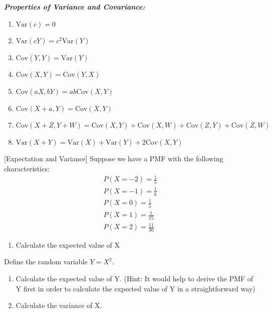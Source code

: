 \documentclass[]{book}
\providecommand{\tightlist}{%
  \setlength{\itemsep}{0pt}\setlength{\parskip}{0pt}}
\theoremstyle{definition}
\theoremstyle{definition}
\theoremstyle{definition}
\theoremstyle{remark}
\begin{document}
\textbf{\emph{Properties of Variance and Covariance:}}

\begin{enumerate}
\def\labelenumi{\arabic{enumi}.}
\tightlist
\item
  \(\text{Var}(c) = 0\)
\item
  \(\text{Var}(cY) = c^2 \text{Var}(Y)\)
\item
  \(\text{Cov}(Y,Y) = \text{Var}(Y)\)
\item
  \(\text{Cov}(X,Y) = \text{Cov}(Y,X)\)
\item
  \(\text{Cov}(aX,bY) = ab \text{Cov}(X,Y)\)
\item
  \(\text{Cov}(X+a,Y) = \text{Cov}(X,Y)\)
\item
  \(\text{Cov}(X+Z,Y+W) = \text{Cov}(X,Y) + \text{Cov}(X,W) + \text{Cov}(Z,Y) + \text{Cov}(Z,W)\)
\item
  \(\text{Var}(X+Y) = \text{Var}(X) + \text{Var}(Y) + 2\text{Cov}(X,Y)\)
\end{enumerate}

[Expectation and Variance]
\protect\hypertarget{exr:expvar}{}{\label{exr:expvar} {} }
Suppose we have a PMF with the following characteristics:
\begin{eqnarray*}
  P(X = -2) = \frac{1}{5}\\
  P(X = -1) = \frac{1}{6}\\
  P(X = 0) = \frac{1}{5}\\
  P(X = 1) = \frac{1}{15}\\
  P(X = 2) = \frac{11}{30}
\end{eqnarray*}

\begin{enumerate}
\def\labelenumi{\arabic{enumi}.}
\tightlist
\item
  Calculate the expected value of X
\end{enumerate}

Define the random variable \(Y = X^2\).

\begin{enumerate}
\def\labelenumi{\arabic{enumi}.}
\setcounter{enumi}{1}
\item
  Calculate the expected value of Y. (Hint: It would help to derive the PMF of Y first in order to calculate the expected value of Y in a straightforward way)
\item
  Calculate the variance of X.
\end{enumerate}
\end{document}
